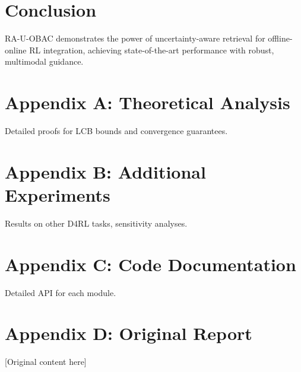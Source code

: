 \documentclass[11pt,a4paper]{article}
\begin{document}
\section{Conclusion}
\label{sec:conclusion}

RA-U-OBAC demonstrates the power of uncertainty-aware retrieval for offline-online RL integration, achieving state-of-the-art performance with robust, multimodal guidance.




\appendix
\section{Appendix A: Theoretical Analysis}
Detailed proofs for LCB bounds and convergence guarantees.

\section{Appendix B: Additional Experiments}
Results on other D4RL tasks, sensitivity analyses.

\section{Appendix C: Code Documentation}
Detailed API for each module.

\section{Appendix D: Original Report}
[Original content here]
\end{document}
